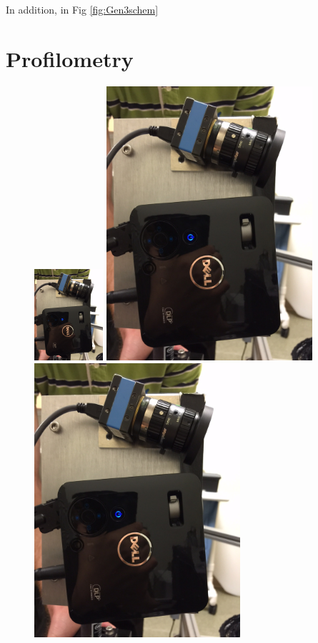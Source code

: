 In addition, in Fig \ref{fig:Gen3schem}



\section{Profilometry}

\begin{figure}
\includegraphics[width = 1in]{./figures/4_Gen3/ProfilPic.jpg} 
\includegraphics[width = 3in]{./figures/4_Gen3/ProfilPic.jpg}\\
\includegraphics[width = 3in]{./figures/4_Gen3/ProfilPic.jpg}

\end{figure}
